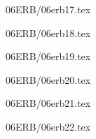 \documentclass[9pt, xcolor={svgnames, x11names},professionalfonts]{beamer}
\def\scale{1}
\begin{document}

\begin{frame}{06ERB/06erb17.tex}	
	\def\scale{0.625}
	\tcb{
		\centering
		
	}
\end{frame}


\begin{frame}{06ERB/06erb18.tex}	
	\def\scale{0.55}
	\tcb{
		\centering
		
	}
\end{frame}


\begin{frame}{06ERB/06erb19.tex}	
	\def\scale{0.55}
	\tcb{
		\centering
		
	}
\end{frame}


\begin{frame}{06ERB/06erb20.tex}	
	\def\scale{0.875}
	\tcb{
		\centering
		
	}
\end{frame}


\begin{frame}{06ERB/06erb21.tex}	
	\def\scale{0.75}
	\tcb{
		\centering
		
	}
\end{frame}


\begin{frame}{06ERB/06erb22.tex}	
	\def\scale{0.75}
	\tcb{
		\centering
		
	}
\end{frame}




\end{document}
